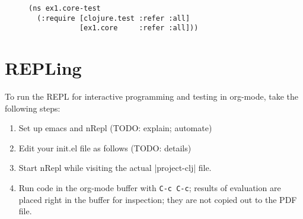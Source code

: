 \documentclass[11pt]{article}
\begin{document}
\begin{figure}[H]
\label{test-namespace}
\begin{verbatim}
(ns ex1.core-test
  (:require [clojure.test :refer :all]
            [ex1.core     :refer :all]))
\end{verbatim}
\end{figure}
\section{REPLing}
\label{sec-4}
\label{sec:emacs-repl}
To run the REPL for interactive programming and testing in org-mode,
take the following steps:
\begin{enumerate}
\item Set up emacs and nRepl (TODO: explain; automate)
\item Edit your init.el file as follows (TODO: details)
\item Start nRepl while visiting the actual |project-clj| file.
\item Run code in the org-mode buffer with \verb|C-c C-c|; results of
evaluation are placed right in the buffer for inspection; they are
not copied out to the PDF file.
\end{enumerate}
\end{document}
